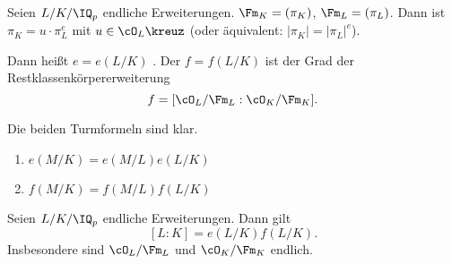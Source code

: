\renewcommand{\lecdate}{28.01.2015}

\begin{Definition}
 Seien $L/K/\IQ_p$ endliche Erweiterungen. $\Fm_K=(\pi_K)$, $\Fm_L=(\pi_L)$. Dann ist $\pi_K=u\cdot \pi_L^e$ mit $u\in\cO_L\kreuz$ (oder äquivalent: $|\pi_K|=|\pi_L|^e$).
 
 Dann heißt $e=e(L/K)$ . Der  $f=f(L/K)$ ist der Grad der Restklassenkörpererweiterung \[ f=[\cO_L/\Fm_L : \cO_K/\Fm_K].\]
\end{Definition}

\begin{Bemerkung}
 Die beiden Turmformeln sind klar.
\begin{enumerate}
 \item $e(M/K)=e(M/L)e(L/K)$
 \item $f(M/K)=f(M/L)f(L/K)$
\end{enumerate}
 \end{Bemerkung}

 \begin{Satz}
  Seien $L/K/\IQ_p$ endliche Erweiterungen. Dann gilt
  \[ [L:K]=e(L/K)f(L/K).\]
  Insbesondere sind $\cO_L/\Fm_L$ und $\cO_K/\Fm_K$ endlich.
 \end{Satz}
 
